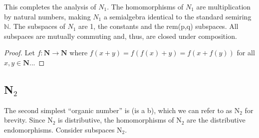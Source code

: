 \documentclass[11pt]{article}
\begin{document}
This completes the analysis of $N_1$.  The homomorphisms of $N_1$ are multiplication by natural numbers, making $N_1$ a semialgebra 
identical to the standard semiring $\mathbb N$.  The subspaces of $N_1$ are 1, the constants and the rem(p,q) subspaces.  All subspaces 
are mutually commuting and, thus, are closed under composition.  

\begin{proof}
Let $f:{\mathbf N}\rightarrow{\mathbf N}$ where $f(x+y)=f(f(x)+y)=f(x+f(y))$ for all $x,y\in\mathbf N$...
\end{proof}

\subsection{N$_2$} 

The second simplest ``organic number'' is (is a b), which we can refer to as N$_2$ for brevity.  Since N$_2$ is distributive, the homomorphisms of N$_2$ 
are the distributive endomorphisms.  Consider subspaces N$_2$.  
\end{document}

